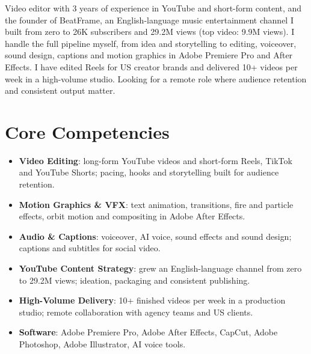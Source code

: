 \documentclass[11pt,a4paper,sans]{moderncv}
\begin{document}
\makecvtitle


\vspace{6pt}
\small{Video editor with 3 years of experience in YouTube and short-form content, and the founder of BeatFrame, an English-language music entertainment channel I built from zero to 26K subscribers and 29.2M views (top video: 9.9M views). I handle the full pipeline myself, from idea and storytelling to editing, voiceover, sound design, captions and motion graphics in Adobe Premiere Pro and After Effects. I have edited Reels for US creator brands and delivered 10+ videos per week in a high-volume studio. Looking for a remote role where audience retention and consistent output matter.}


\section{Core Competencies}
\vspace{1pt}
\begin{itemize}
\item \textbf{Video Editing}: long-form YouTube videos and short-form Reels, TikTok and YouTube Shorts; pacing, hooks and storytelling built for audience retention.
\item \textbf{Motion Graphics \& VFX}: text animation, transitions, fire and particle effects, orbit motion and compositing in Adobe After Effects.
\item \textbf{Audio \& Captions}: voiceover, AI voice, sound effects and sound design; captions and subtitles for social video.
\item \textbf{YouTube Content Strategy}: grew an English-language channel from zero to 29.2M views; ideation, packaging and consistent publishing.
\item \textbf{High-Volume Delivery}: 10+ finished videos per week in a production studio; remote collaboration with agency teams and US clients.
\item \textbf{Software}: Adobe Premiere Pro, Adobe After Effects, CapCut, Adobe Photoshop, Adobe Illustrator, AI voice tools.
\end{itemize}
\end{document}

